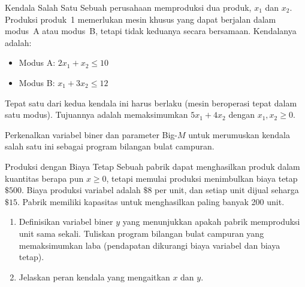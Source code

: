 \begin{ex}{Kendala Salah Satu}{}
\label{ex:either-or-modes}
 Sebuah perusahaan memproduksi dua produk, $x_1$ dan $x_2$. Produksi produk~1 memerlukan mesin khusus yang dapat berjalan dalam modus~A atau modus~B, tetapi tidak keduanya secara bersamaan. Kendalanya adalah:
\begin{itemize}
\item Modus A: $2x_1 + x_2 \leq 10$
\item Modus B: $x_1 + 3x_2 \leq 12$
\end{itemize}
Tepat satu dari kedua kendala ini harus berlaku (mesin beroperasi tepat dalam satu modus). Tujuannya adalah memaksimumkan $5x_1 + 4x_2$ dengan $x_1, x_2 \geq 0$.

Perkenalkan variabel biner dan parameter Big-$M$ untuk merumuskan kendala salah satu ini sebagai program bilangan bulat campuran.
\exrefs{\S\ref{subsec:either-or}}
\end{ex}

\begin{ex}{Produksi dengan Biaya Tetap}{}
\label{ex:fixed-charge}
 Sebuah pabrik dapat menghasilkan produk dalam kuantitas berapa pun $x \geq 0$, tetapi memulai produksi menimbulkan biaya tetap $\$500$. Biaya produksi variabel adalah $\$8$ per unit, dan setiap unit dijual seharga $\$15$. Pabrik memiliki kapasitas untuk menghasilkan paling banyak 200 unit.

\begin{enumerate}
\item Definisikan variabel biner $y$ yang menunjukkan apakah pabrik memproduksi unit sama sekali. Tuliskan program bilangan bulat campuran yang memaksimumkan laba (pendapatan dikurangi biaya variabel dan biaya tetap).
\item Jelaskan peran kendala yang mengaitkan $x$ dan $y$.
\end{enumerate}
\exrefs{\S\ref{subsec:big-M-activation}}
\end{ex}


